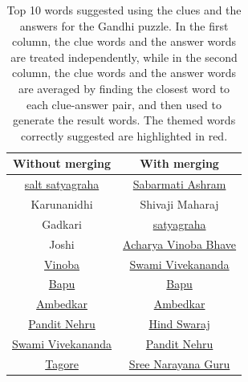 \documentclass[twoside]{article}
\begin{document}
\begin{table}[h!]
  \begin{center}
    \begin{tabular}{c c}
      \toprule
      \textbf{Without merging} & \textbf{With merging}  \\ 
      \midrule
      \ul{salt satyagraha} & \ul{Sabarmati Ashram} \\
      Karunanidhi & Shivaji Maharaj\\
      Gadkari & \ul{satyagraha}\\
      Joshi & \ul{Acharya Vinoba Bhave}\\
      \ul{Vinoba} & \ul{Swami Vivekananda} \\
      \ul{Bapu} & \ul{Bapu} \\
      \ul{Ambedkar} & \ul{Ambedkar} \\
      \ul{Pandit Nehru} & \ul{Hind Swaraj} \\
      \ul{Swami Vivekananda}& \ul{Pandit Nehru} \\
      \ul{Tagore} & \ul{Sree Narayana Guru} \\
      \bottomrule
    \end{tabular}
    \caption{Top 10 words suggested using the clues and the answers for the Gandhi puzzle. In the first column, the clue words and the answer words are treated independently, while in the second column, the clue words and the answer words are averaged by finding the closest word to each clue-answer pair, and then used to generate the result words. The themed words correctly suggested are highlighted in red.}
    \label{tab:table4}
  \end{center}
\end{table}
\end{document}
